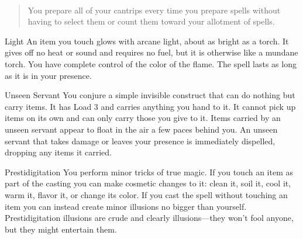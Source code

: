 \documentclass[8pt]{extarticle}
\begin{document}

\


\begin{multicols}{2}

  \begin{quote}
    You prepare all of your cantrips every time you prepare spells
    without having to select them or count them toward your allotment
    of spells.
  \end{quote}

  \begin{aspell}{Light}{}
    An item you touch glows with arcane light, about as bright as a
    torch. It gives off no heat or sound and requires no fuel, but it
    is otherwise like a mundane torch.  You have complete control of
    the color of the flame. The spell lasts as long as it is in your
    presence.
  \end{aspell}

\vfill\null
\columnbreak

  \begin{aspell}{Unseen Servant}{}
    You conjure a simple invisible construct that can do nothing but
    carry items. It has Load 3 and carries anything you hand to it. It
    cannot pick up items on its own and can only carry those you give
    to it. Items carried by an unseen servant appear to float in the
    air a few paces behind you. An unseen servant that takes damage or
    leaves your presence is immediately dispelled, dropping any items
    it carried.
  \end{aspell}

  \begin{aspell}{Prestidigitation}{}
    You perform minor tricks of true magic. If you touch an item as
    part of the casting you can make cosmetic changes to it: clean it,
    soil it, cool it, warm it, flavor it, or change its color. If you
    cast the spell without touching an item you can instead create
    minor illusions no bigger than yourself. Prestidigitation
    illusions are crude and clearly illusions—they won’t fool anyone,
    but they might entertain them.
  \end{aspell}

\vfill\null
\end{multicols}
\end{document}
